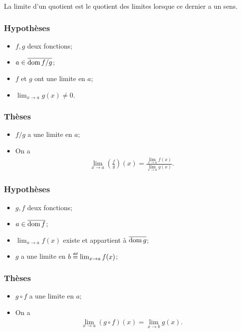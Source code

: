 \documentclass[main.tex]{subfiles}
\begin{document}
La limite d'un quotient est le quotient des limites
lorsque ce dernier a un sens.

\begin{proposition}

    \subsubsection*{Hypothèses}
    \begin{itemize}
        \item $f, g$ deux fonctions;
        \item $a \in \overline{\operatorname{dom} f/g}$;
        \item $f$ et $g$ ont une limite en $a$;
        \item $\lim_{x \to a} g(x) \neq 0$.
    \end{itemize}

    \subsubsection*{Thèses}
    \begin{itemize}
        \item $f/g$ a une limite en $a$;
        \item On a
            \begin{align}
                \lim_{x \to a} \left(\frac f g\right)(x) = \frac {\lim_{x \to a} f(x)} {\lim_{x \to a} g(x)}.
            \end{align}
    \end{itemize}
\end{proposition}

\begin{proposition}

    \subsubsection*{Hypothèses}
    \begin{itemize}
        \item $g, f$ deux fonctions;
        \item $a \in \overline{\operatorname{dom} f}$;
        \item $\lim_{x \to a} f(x)$ existe et appartient à $\overline{\operatorname{dom} g}$;
        \item $g$ a une limite en $b \defeq \lim_{x \to a} f(x)$;
    \end{itemize}

    \subsubsection*{Thèses}
    \begin{itemize}
        \item $g \circ f$ a une limite en $a$;
        \item On a
            \begin{align}
                \lim_{x \to a} (g \circ f)(x) = \lim_{x \to b} g(x).
            \end{align}
    \end{itemize}
\end{proposition}
\end{document}
